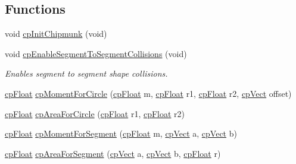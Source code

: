 \subsection*{Functions}
\begin{DoxyCompactItemize}
\item 
void \hyperlink{group__misc_gaeb128d1145cdc7bcb0f7a14ada64616c}{cp\-Init\-Chipmunk} (void)
\item 
\hypertarget{group__misc_ga73ae9a9239e6569afba9beb54e56dbc7}{void \hyperlink{group__misc_ga73ae9a9239e6569afba9beb54e56dbc7}{cp\-Enable\-Segment\-To\-Segment\-Collisions} (void)}\label{group__misc_ga73ae9a9239e6569afba9beb54e56dbc7}

\begin{DoxyCompactList}\small\item\em Enables segment to segment shape collisions. \end{DoxyCompactList}\item 
\hyperlink{group__basic_types_gac1ed65573e035bf892505768c852d8d3}{cp\-Float} \hyperlink{group__misc_gaf1dfe63f43b3dd42e47f37f16ae2dfe4}{cp\-Moment\-For\-Circle} (\hyperlink{group__basic_types_gac1ed65573e035bf892505768c852d8d3}{cp\-Float} m, \hyperlink{group__basic_types_gac1ed65573e035bf892505768c852d8d3}{cp\-Float} r1, \hyperlink{group__basic_types_gac1ed65573e035bf892505768c852d8d3}{cp\-Float} r2, \hyperlink{structcp_vect}{cp\-Vect} offset)
\item 
\hyperlink{group__basic_types_gac1ed65573e035bf892505768c852d8d3}{cp\-Float} \hyperlink{group__misc_ga9293a100703445eed36e8673eefe42a1}{cp\-Area\-For\-Circle} (\hyperlink{group__basic_types_gac1ed65573e035bf892505768c852d8d3}{cp\-Float} r1, \hyperlink{group__basic_types_gac1ed65573e035bf892505768c852d8d3}{cp\-Float} r2)
\item 
\hyperlink{group__basic_types_gac1ed65573e035bf892505768c852d8d3}{cp\-Float} \hyperlink{group__misc_gab5a7ed754d3dfe06432b6295472b2f54}{cp\-Moment\-For\-Segment} (\hyperlink{group__basic_types_gac1ed65573e035bf892505768c852d8d3}{cp\-Float} m, \hyperlink{structcp_vect}{cp\-Vect} a, \hyperlink{structcp_vect}{cp\-Vect} b)
\item 
\hypertarget{group__misc_gafb203c6c2898391e5a602bb9fb623638}{\hyperlink{group__basic_types_gac1ed65573e035bf892505768c852d8d3}{cp\-Float} \hyperlink{group__misc_gafb203c6c2898391e5a602bb9fb623638}{cp\-Area\-For\-Segment} (\hyperlink{structcp_vect}{cp\-Vect} a, \hyperlink{structcp_vect}{cp\-Vect} b, \hyperlink{group__basic_types_gac1ed65573e035bf892505768c852d8d3}{cp\-Float} r)}\label{group__misc_gafb203c6c2898391e5a602bb9fb623638}


\end{DoxyCompactItemize}
